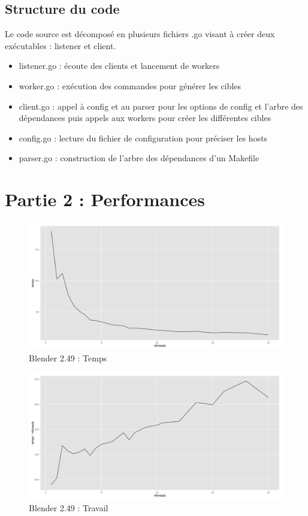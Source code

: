 \documentclass[a4paper,11pt]{article}
\begin{document}
\subsection{Structure du code}
Le code source est décomposé en plusieurs fichiers .go visant à créer deux exécutables : listener et client.
\begin{itemize}
\item listener.go : écoute des clients et lancement de workers
\item worker.go : exécution des commandes pour générer les cibles
\item client.go : appel à config et au parser pour les options de config et l'arbre des dépendances puis appels aux workers pour créer les différentes cibles
\item config.go : lecture du fichier de configuration pour préciser les hosts
\item parser.go : construction de l'arbre des dépendances d'un Makefile
\end{itemize}

\section{Partie 2 : Performances}

\begin{figure}[htbp]
  \centering
  \includegraphics[scale=0.35]{img/blender1_temps.png}
  \caption{Blender 2.49 : Temps}
\end{figure}

\begin{figure}[htbp]
  \centering
  \includegraphics[scale=0.35]{img/blender1_travail.png}
  \caption{Blender 2.49 : Travail}
\end{figure}
\end{document}
